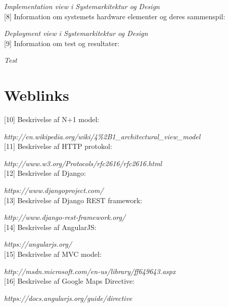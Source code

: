 \qquad \textit{ Implementation view i Systemarkitektur og Design} \\


[8] Information om systemets hardware elementer og deres sammenspil:
\vspace{-0.3cm}

\qquad \textit{Deployment view i Systemarkitektur og Design} \\


[9] Information om test og resultater:
\vspace{-0.3cm}

\qquad \textit{Test} \\


\newpage

\section*{Weblinks}
 
[10] Beskrivelse af N+1 model:
\vspace{-0.3cm}

\qquad \textit{http://en.wikipedia.org/wiki/4\%2B1\_architectural\_view\_model} \\ 


[11] Beskrivelse af HTTP protokol:
\vspace{-0.3cm}

\qquad  \textit{http://www.w3.org/Protocols/rfc2616/rfc2616.html}\\


[12] Beskrivelse af Django:
\vspace{-0.3cm}

\qquad \textit{https://www.djangoproject.com/} \\ 


[13] Beskrivelse af Django REST framework:
\vspace{-0.3cm}

\qquad \textit{http://www.django-rest-framework.org/} \\ 


[14] Beskrivelse af AngularJS:
\vspace{-0.3cm}

\qquad \textit{https://angularjs.org/} \\ 


[15] Beskrivelse af MVC model:
\vspace{-0.3cm}

\qquad \textit{http://msdn.microsoft.com/en-us/library/ff649643.aspx} \\ 


[16] Beskrivelse af Google Maps Directive:
\vspace{-0.3cm}

\qquad \textit{https://docs.angularjs.org/guide/directive}  
